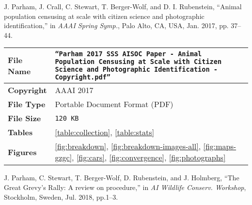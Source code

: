 \begin{tcolorbox}
    J. Parham, J. Crall, C. Stewart, T. Berger-Wolf, and D. I. Rubenstein, ``Animal population censusing at scale with citizen science and photographic identification,'' in \textit{AAAI Spring Symp.}, Palo Alto, CA, USA, Jan. 2017, pp. 37–44.
\end{tcolorbox}

\begin{table*}[!ht]
    \begin{center}
        \begin{tabular}{| l | p{13.5cm} |}
            \hline
            \textbf{File Name} & \texttt{``Parham 2017 SSS AISOC Paper - Animal Population Censusing at Scale with Citizen Science and Photographic Identification - Copyright.pdf''} \\
            \hline
            \textbf{Copyright} & AAAI 2017                                                                                                                                            \\
            \hline
            \textbf{File Type} & Portable Document Format (PDF)                                                                                                                       \\
            \hline
            \textbf{File Size} & \texttt{120 KB}                                                                                                                                      \\
            \hline
            \textbf{Tables}    & \ref{table:collection}, \ref{table:stats}                                                                                                            \\
            \hline
            \textbf{Figures}   & \ref{fig:breakdown}, \ref{fig:breakdown-images-all}, \ref{fig:maps-gzgc}, \ref{fig:cars}, \ref{fig:convergence}, \ref{fig:photographs}               \\
            \hline
        \end{tabular}
    \end{center}
\end{table*}

\begin{tcolorbox}
    J. Parham, C. Stewart, T. Berger-Wolf, D. Rubenstein, and J. Holmberg, ``The Great Grevy’s Rally: A review on procedure,'' in \textit{AI Wildlife Conserv. Workshop}, Stockholm, Sweden, Jul. 2018, pp.1–3.
\end{tcolorbox}

